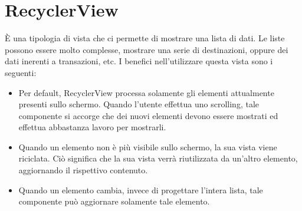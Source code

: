 \section{RecyclerView}
È una tipologia di vista che ci permette di mostrare una lista di dati. Le liste possono essere molto complesse, mostrare una serie di destinazioni, oppure dei dati inerenti a transazioni, etc. I benefici nell'utilizzare questa vista sono i seguenti:
\begin{itemize}
    \item Per default, RecyclerView processa solamente gli elementi attualmente presenti sullo schermo. Quando l'utente effettua uno scrolling, tale componente si accorge che dei nuovi elementi devono essere mostrati ed effettua abbastanza lavoro per mostrarli.
    \item Quando un elemento non è più visibile sullo schermo, la sua vista viene riciclata. Ciò significa che la sua vista verrà riutilizzata da un'altro elemento, aggiornando il rispettivo contenuto.
    \item Quando un elemento cambia, invece di progettare l'intera lista, tale componente può aggiornare solamente tale elemento.
\end{itemize}

